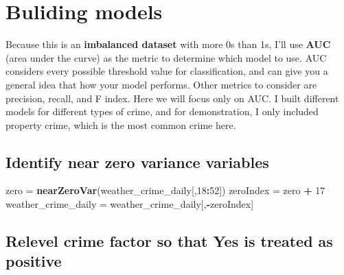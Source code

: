 \documentclass[]{article}
\newenvironment{Shaded}{\begin{snugshade}}{\end{snugshade}}
\newcommand{\KeywordTok}[1]{\textcolor[rgb]{0.13,0.29,0.53}{\textbf{#1}}}
\newcommand{\DataTypeTok}[1]{\textcolor[rgb]{0.13,0.29,0.53}{#1}}
\newcommand{\DecValTok}[1]{\textcolor[rgb]{0.00,0.00,0.81}{#1}}
\newcommand{\StringTok}[1]{\textcolor[rgb]{0.31,0.60,0.02}{#1}}
\newcommand{\OperatorTok}[1]{\textcolor[rgb]{0.81,0.36,0.00}{\textbf{#1}}}
\newcommand{\NormalTok}[1]{#1}
\begin{document}
\section{Buliding models}\label{buliding-models}

Because this is an \textbf{imbalanced dataset} with more 0s than 1s,
I'll use \textbf{AUC} (area under the curve) as the metric to determine
which model to use. AUC considers every possible threshold value for
classification, and can give you a general idea that how your model
performs. Other metrics to consider are precision, recall, and F index.
Here we will focus only on AUC. I built different models for different
types of crime, and for demonstration, I only included property crime,
which is the most common crime here.

\subsection{Identify near zero variance
variables}\label{identify-near-zero-variance-variables}

\begin{Shaded}
\begin{Highlighting}[]
\NormalTok{zero =}\StringTok{ }\KeywordTok{nearZeroVar}\NormalTok{(weather_crime_daily[,}\DecValTok{18}\OperatorTok{:}\DecValTok{52}\NormalTok{])}
\NormalTok{zeroIndex =}\StringTok{ }\NormalTok{zero }\OperatorTok{+}\StringTok{ }\DecValTok{17}
\NormalTok{weather_crime_daily =}\StringTok{ }\NormalTok{weather_crime_daily[,}\OperatorTok{-}\NormalTok{zeroIndex]}
\end{Highlighting}
\end{Shaded}

\subsection{Relevel crime factor so that Yes is treated as
positive}\label{relevel-crime-factor-so-that-yes-is-treated-as-positive}

\begin{Shaded}
\end{Shaded}
\end{document}
